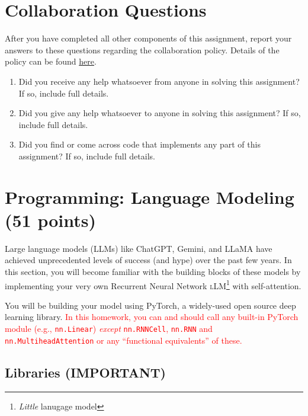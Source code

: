\documentclass[11pt,addpoints,answers]{exam}
\begin{document}
\section{Collaboration Questions}
After you have completed all other components of this assignment, report your answers to these questions regarding the collaboration policy. Details of the policy can be found \href{http://www.cs.cmu.edu/~mgormley/courses/10601/syllabus.html}{here}.
\begin{enumerate}
    \item Did you receive any help whatsoever from anyone in solving this assignment? If so, include full details.
    \item Did you give any help whatsoever to anyone in solving this assignment? If so, include full details.
    \item Did you find or come across code that implements any part of this assignment? If so, include full details.
\end{enumerate}

\begin{your_solution}[height=6cm]

\end{your_solution}

\newpage
\section{Programming: Language Modeling (51 points)}
\label{programming}

Large language models (LLMs) like ChatGPT, Gemini, and LLaMA have achieved unprecedented levels of success (and hype) over the past few years. In this section, you will become familiar with the building blocks of these models by implementing your very own Recurrent Neural Network \textsc{l}LM\footnote{\textit{Little} lanugage model} with self-attention.

You will be building your model using PyTorch, a widely-used open source deep learning library. \textcolor{red}{In this homework, you can and should call any built-in PyTorch module (e.g., \texttt{nn.Linear}) \textit{except} \texttt{nn.RNNCell}, \texttt{nn.RNN} and \texttt{nn.MultiheadAttention} or any “functional equivalents” of these.}



\subsection{Libraries (IMPORTANT)}
\end{document}
